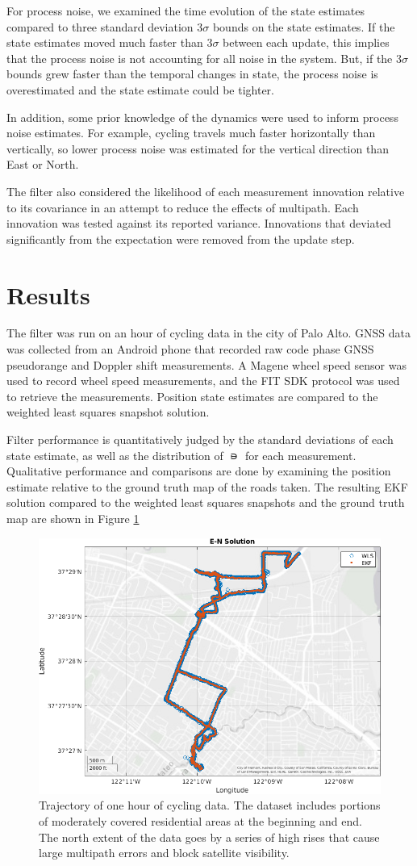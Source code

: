 \documentclass[letterpaper,times]{IONconf}
\begin{document}
For process noise, we examined the time evolution of the state estimates compared to three standard deviation $3 \sigma $ bounds on the state estimates. If the state estimates moved much faster than $3 \sigma $ between each update, this implies that the process noise is not accounting for all noise in the system. But, if the $3 \sigma $ bounds grew faster than the temporal changes in state, the process noise is overestimated and the state estimate could be tighter. 

In addition, some prior knowledge of the dynamics were used to inform process noise estimates. For example, cycling travels much faster horizontally than vertically, so lower process noise was estimated for the vertical direction than East or North.  

The filter also considered the likelihood of each measurement innovation relative to its covariance in an attempt to reduce the effects of multipath. Each innovation was tested against its reported variance. Innovations that deviated significantly from the expectation were removed from the update step.

\section{Results}

The filter was run on an hour of cycling data in the city of Palo Alto. GNSS data was collected from an Android phone that recorded raw code phase GNSS pseudorange and Doppler shift measurements. A Magene wheel speed sensor was used to record wheel speed measurements, and the FIT SDK protocol was used to retrieve the measurements. Position state estimates are compared to the weighted least squares snapshot solution. 

Filter performance is quantitatively judged by the standard deviations of each state estimate, as well as the distribution of $\nis$ for each measurement. Qualitative performance and comparisons are done by examining the position estimate relative to the ground truth map of the roads taken. The resulting EKF solution compared to the weighted least squares snapshots and the ground truth map are shown in Figure \ref{fig:traj}

\begin{figure}
    \centering
    \includegraphics[width=.5\textwidth]{traj}
    \caption{Trajectory of one hour of cycling data. The dataset includes portions of moderately covered residential areas at the beginning and end. The north extent of the data goes by a series of high rises that cause large multipath errors and block satellite visibility.}\label{fig:traj}
\end{figure}
\end{document}
